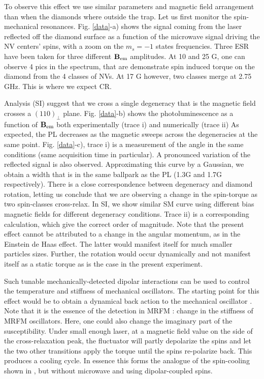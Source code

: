 \documentclass[preprintnumbers,amsmath,amssymb,superscriptaddress,twocolumn,showpacs]{revtex4-1}
\begin{document}

To observe this effect we use similar parameters and magnetic field arrangement than when the diamonds where outside the trap.
Let us first monitor the spin-mechanical resonances. 
Fig. \ref{data}-a) shows the signal coming from the laser reflected off the diamond surface as a function of the microwave signal driving the NV centers' spins, with a zoom on the $m_s=-1$ states frequencies.
Three ESR have been taken for three different $\bf B_{\rm em}$ amplitudes. 
At 10 and 25 G, one can observe 4 pics in the spectrum, that are demonstrate spin induced torque on the diamond from the 4 classes of NVs.
At 17 G however, two classes merge at 2.75 GHz. This is where we expect CR.

Analysis (SI) suggest that we cross a single degeneracy that is the magnetic field crosses a $(110)_\perp$ plane.
 Fig. \ref{data}-b) shows the photoluminescence as a function of $\bf B_{\rm em}$ both experimentally (trace i) and numerically (trace ii)
As expected, the PL decreases as the magnetic sweeps across the degeneracies at the same point. 
 Fig. \ref{data}-c), trace i) is a measurement of the angle in the same conditions (same acquisition time in particular). 
A pronounced variation of the reflected signal is also observed. Approximating this curve by a Gaussian, we obtain a width that is in the same ballpark as the PL (1.3G and 1.7G respectively).
There is a close correspondence between degeneracy and diamond rotation, letting us conclude that we are observing a change in the spin-torque as two spin-classes cross-relax. 
In SI, we show similar SM curve using different bias magnetic fields for different degeneracy conditions. 
Trace ii) is a corresponding calculation, which give the correct order of magnitude.  
Note that the present effect cannot be attributed to a change in the angular momentum, as in the Einstein de Haas effect. 
The latter would manifest itself for much smaller particles sizes. Further, the rotation would occur dynamically and not manifest itself as a static torque as is the case in the present experiment. 

Such tunable mechanically-detected dipolar interactions can be used to control the temperature and stiffness of mechanical oscillators.
The starting point for this effect would be to obtain a dynamical back action to the mechanical oscillator \cite{aspelmeyer}. 
Note that it is the essence of the detection in MRFM : change in the stiffness of MRFM oscillators. Here, one could also change the imaginary part of the susceptibility.
Under small enough laser, at a magnetic field value on the side of the cross-relaxation peak, the fluctuator will partly depolarize the spins and let the two other transitions apply the torque until the spins re-polarize back. This produces a cooling cycle.  
In essence this forms the analogue of the spin-cooling shown in \cite{DelordNat}, but without microwave and using dipolar-coupled spins.
\end{document}
